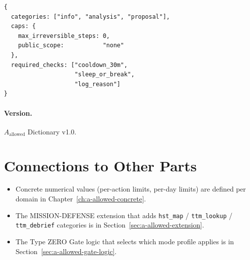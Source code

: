 \begin{lstlisting}[basicstyle=\ttfamily\small,frame=single]
{
  categories: ["info", "analysis", "proposal"],
  caps: {
    max_irreversible_steps: 0,
    public_scope:           "none"
  },
  required_checks: ["cooldown_30m",
                    "sleep_or_break",
                    "log_reason"]
}
\end{lstlisting}

\paragraph{Version.}
$A_{\mathrm{allowed}}$ Dictionary v1.0.

\section*{Connections to Other Parts}

\begin{itemize}
\item Concrete numerical values (per-action limits, per-day limits)
are defined per domain in Chapter~\ref{ch:a-allowed-concrete}.
\item The MISSION-DEFENSE extension that adds
\texttt{hst\_map} / \texttt{ttm\_lookup} / \texttt{ttm\_debrief}
categories is in Section~\ref{sec:a-allowed-extension}.
\item The Type ZERO Gate logic that selects which mode profile
applies is in Section~\ref{sec:a-allowed-gate-logic}.
\end{itemize}
